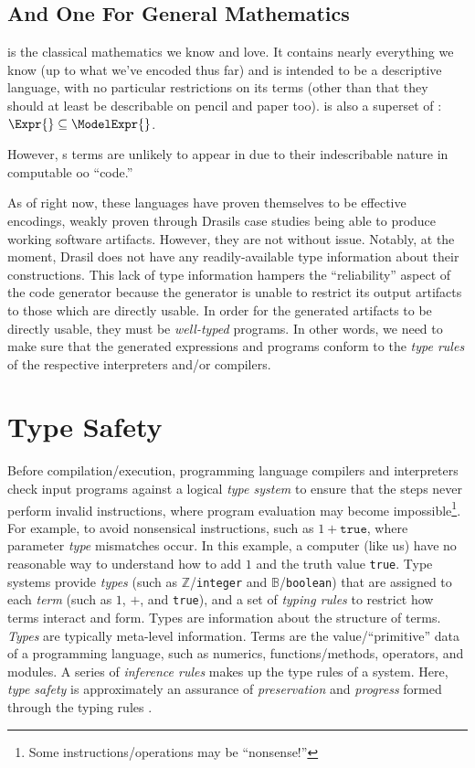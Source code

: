 \subsection{And One For General Mathematics}

\ModelExpr{} is the classical mathematics we know and love. It contains nearly
everything we know (up to what we've encoded thus far) and is intended to be a
descriptive language, with no particular restrictions on its terms (other than
that they should at least be describable on pencil and paper too). \ModelExpr{}
is also a superset of \Expr{}: \(\Expr{} \subseteq{} \ModelExpr{}\).

However, \ModelExpr{}s terms are unlikely to appear in \CodeExpr{} due to their
indescribable nature in computable \acs{oo} ``code.''

As of right now, these languages have proven themselves to be effective
encodings, weakly proven through Drasils case studies being able to produce
working software artifacts. However, they are not without issue. Notably, at the
moment, Drasil does not have any readily-available type information about their
constructions. This lack of type information hampers the ``reliability'' aspect
of the code generator because the generator is unable to restrict its output
artifacts to those which are directly usable. In order for the generated
artifacts to be directly usable, they must be \textit{well-typed} programs. In
other words, we need to make sure that the generated expressions and programs
conform to the \textit{type rules} of the respective interpreters and/or
compilers.

\section{Type Safety}

Before compilation/execution, programming language compilers and interpreters
check input programs against a logical \textit{type system} to ensure that the
steps never perform invalid instructions, where program evaluation may become
impossible\footnote{Some instructions/operations may be ``nonsense!''}. For
example, to avoid nonsensical instructions, such as \(1 + \texttt{true}\), where
parameter \textit{type} mismatches occur. In this example, a computer (like us)
have no reasonable way to understand how to add \(1\) and the truth value
\texttt{true}. Type systems provide \textit{types} (such as
\(\mathbb{Z}\)/\texttt{integer} and \(\mathbb{B}\)/\texttt{boolean}) that are
assigned to each \textit{term} (such as \(1\), \(+\), and \texttt{true}), and a
set of \textit{typing rules} to restrict how terms interact and form. Types are
information about the structure of terms. \textit{Types} are typically
meta-level information. Terms are the value/``primitive'' data of a programming
language, such as numerics, functions/methods, operators, and modules. A series
of \textit{inference rules} makes up the type rules of a system. Here,
\textit{type safety} is approximately an assurance of \textit{preservation} and
\textit{progress} formed through the typing rules \cite{Harper2016}.

